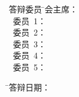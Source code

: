 \vspace{12mm}%

\begin{tabbing}
\hspace{5mm}\Songti\sihao 答辩委员 \hspace{-2.6mm} \= \Songti\sihao 会主席： \= \underline{\makebox[9cm]{\sihao\zjucommitteemainc}} \\
          \>    \Songti\sihao~委员~1： \> \underline{\makebox[9cm]{\sihao\zjucommitteeonec}} \\
          \>    \Songti\sihao~委员~2： \> \underline{\makebox[9cm]{\sihao\zjucommitteetwoc}} \\
          \>    \Songti\sihao~委员~3： \> \underline{\makebox[9cm]{\sihao\zjucommitteethreec}} \\
          \>    \Songti\sihao~委员~4： \> \underline{\makebox[9cm]{\sihao\zjucommitteefourc}} \\
          \>    \Songti\sihao~委员~5： \> \underline{\makebox[9cm]{\sihao\zjucommitteefivec}}
\end{tabbing}

\vspace{12mm}%

\begin{tabbing}
\hspace{34mm} \= \Songti\sihao 答辩日期： \= \underline{\makebox[5cm]{\Songti\sihao\zjudefencedatec}} \\
\end{tabbing}

